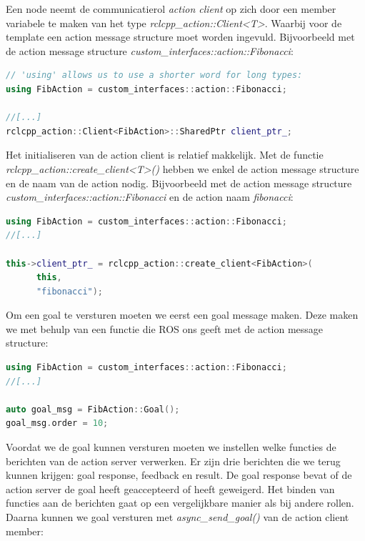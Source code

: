 Een node neemt de communicatierol \textit{action client} op zich door een member variabele te maken van het type \textit{rclcpp\_action::Client<T>}. Waarbij voor de template een action message structure moet worden ingevuld. Bijvoorbeeld met de action message structure \textit{custom\_interfaces::action::Fibonacci}:

\begin{lstlisting}[language=C++, caption={}, firstnumber=0, label={}]
// 'using' allows us to use a shorter word for long types:
using FibAction = custom_interfaces::action::Fibonacci;

//[...]
rclcpp_action::Client<FibAction>::SharedPtr client_ptr_;
\end{lstlisting}

\noindent Het initialiseren van de action client is relatief makkelijk. Met de functie \textit{rclcpp\_action::create\_client<T>()} hebben we enkel de action message structure en de naam van de action nodig. Bijvoorbeeld met de action message structure \textit{custom\_interfaces::action::Fibonacci} en de action naam \textit{fibonacci}:



\begin{lstlisting}[language=C++, caption={}, firstnumber=0, label={}]
using FibAction = custom_interfaces::action::Fibonacci;
//[...]

this->client_ptr_ = rclcpp_action::create_client<FibAction>(
      this,
      "fibonacci");
\end{lstlisting}

\noindent Om een goal te versturen moeten we eerst een goal message maken. Deze maken we met behulp van een functie die ROS ons geeft met de action message structure:

\begin{lstlisting}[language=C++, caption={}, firstnumber=0, label={}]
using FibAction = custom_interfaces::action::Fibonacci;
//[...]

auto goal_msg = FibAction::Goal();
goal_msg.order = 10;
\end{lstlisting}

\noindent Voordat we de goal kunnen versturen moeten we instellen welke functies de berichten van de action server verwerken. Er zijn drie berichten die we terug kunnen krijgen: goal response, feedback en result. De goal response bevat of de action server de goal heeft geaccepteerd of heeft geweigerd. Het binden van functies aan de berichten gaat op een vergelijkbare manier als bij andere rollen. Daarna kunnen we goal versturen met \textit{async\_send\_goal()} van de action client member:

